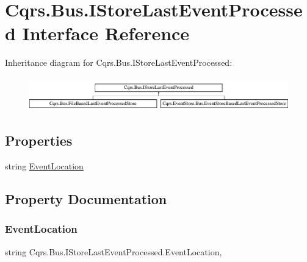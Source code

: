 \hypertarget{interfaceCqrs_1_1Bus_1_1IStoreLastEventProcessed}{}\section{Cqrs.\+Bus.\+I\+Store\+Last\+Event\+Processed Interface Reference}
\label{interfaceCqrs_1_1Bus_1_1IStoreLastEventProcessed}
Inheritance diagram for Cqrs.\+Bus.\+I\+Store\+Last\+Event\+Processed\+:\begin{figure}[H]
\begin{center}
\leavevmode
\includegraphics[height=1.462141cm]{interfaceCqrs_1_1Bus_1_1IStoreLastEventProcessed}
\end{center}
\end{figure}
\subsection*{Properties}
\begin{DoxyCompactItemize}
\item 
string \hyperlink{interfaceCqrs_1_1Bus_1_1IStoreLastEventProcessed_a4273c4f0bd5703d5eec2c0625436ed69_a4273c4f0bd5703d5eec2c0625436ed69}{Event\+Location}
\end{DoxyCompactItemize}


\subsection{Property Documentation}
\mbox{\label{interfaceCqrs_1_1Bus_1_1IStoreLastEventProcessed_a4273c4f0bd5703d5eec2c0625436ed69_a4273c4f0bd5703d5eec2c0625436ed69}} 
\subsubsection{\texorpdfstring{Event\+Location}{EventLocation}}
{\footnotesize\ttfamily string Cqrs.\+Bus.\+I\+Store\+Last\+Event\+Processed.\+Event\+Location\hspace{0.3cm}{\ttfamily [get]}, {\ttfamily [set]}}

